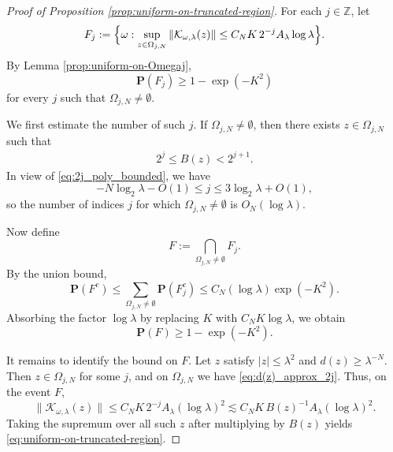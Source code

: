 \documentclass[12pt,reqno]{amsart}
\theoremstyle{definition}
\theoremstyle{remark}
\numberwithin{equation}{section}
\newcommand{\1}{\mathbbm{1}}
\begin{document}
\begin{proof}[Proof of Proposition \ref{prop:uniform-on-truncated-region}]
For each \(j\in \mathbb Z\), let
\[
F_j:=
\Bigl\{
\omega:
\sup_{z\in \Omega_{j,N}}\|\mathcal K_{\omega,\lambda}(z)\|
\leq
C_NK\,2^{-j}A_\lambda \log\lambda
\Bigr\}.
\]
By Lemma \ref{prop:uniform-on-Omegaj},
\[
\mathbf P(F_j)\geq 1-\exp(-K^2)
\]
for every \(j\) such that \(\Omega_{j,N}\neq \emptyset\).

We first estimate the number of such \(j\). If \(\Omega_{j,N}\neq \emptyset\), then
there exists \(z\in \Omega_{j,N}\) such that
\begin{align}\label{eq:d(z)_approx_2j}
2^j\leq B(z)<2^{j+1}.
\end{align}
In view of \eqref{eq:2j_poly_bounded}, we have
\[
-N\log_2\lambda-O(1)\leq j\leq 3\log_2\lambda+O(1),
\]
so the number of indices \(j\) for which \(\Omega_{j,N}\neq \emptyset\) is
\(O_N(\log\lambda)\).

Now define
\[
F:=\bigcap_{\Omega_{j,N}\neq \emptyset} F_j.
\]
By the union bound,
\[
\mathbf P(F^c)
\leq
\sum_{\Omega_{j,N}\neq \emptyset}\mathbf P(F_j^c)
\leq
C_N(\log\lambda)\exp(-K^2).
\]
Absorbing the factor \(\log\lambda\) by replacing \(K\) with \(C_NK\log\lambda\), we obtain
\[
\mathbf P(F)\geq 1-\exp(-K^2).
\]

It remains to identify the bound on \(F\). Let \(z\) satisfy \(|z|\leq \lambda^2\)
and \(d(z)\geq \lambda^{-N}\). Then \(z\in \Omega_{j,N}\) for some \(j\), and on
\(\Omega_{j,N}\) we have \eqref{eq:d(z)_approx_2j}.
Thus, on the event \(F\),
\[
\|\mathcal K_{\omega,\lambda}(z)\|
\leq
C_NK\,2^{-j}A_\lambda (\log\lambda)^2
\lesssim
C_NK\,B(z)^{-1}A_\lambda (\log\lambda)^2.
\]
Taking the supremum over all such \(z\)
after multiplying by \(B(z)\) yields
\eqref{eq:uniform-on-truncated-region}.
\end{proof}
\end{document}
